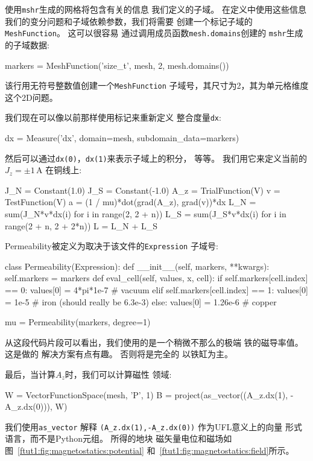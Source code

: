 使用\texttt{mshr}生成的网格将包含有关的信息
我们定义的子域。 在定义中使用这些信息
我们的变分问题和子域依赖参数，我们将需要
创建一个标记子域的\texttt{MeshFunction}。 这可以很容易
通过调用成员函数\texttt{mesh.domains}创建的
\texttt{mshr}生成的子域数据:

\begin{python}
markers = MeshFunction('size_t', mesh, 2, mesh.domains())
\end{python}
该行用无符号整数值创建一个\texttt{MeshFunction}
子域号，其尺寸为2，其为单元格维度
这个2D问题。

我们现在可以像以前那样使用标记来重新定义
整合度量\texttt{dx}:


\begin{python}
dx = Measure('dx', domain=mesh, subdomain_data=markers)
\end{python}
然后可以通过\texttt{dx(0)}，\texttt{dx(1)}来表示子域上的积分，
等等。 我们用它来定义当前的$J_z = \pm 1\,\mathrm{A}$
在铜线上:

\begin{python}
J_N = Constant(1.0)
J_S = Constant(-1.0)
A_z = TrialFunction(V)
v = TestFunction(V)
a = (1 / mu)*dot(grad(A_z), grad(v))*dx
L_N = sum(J_N*v*dx(i) for i in range(2, 2 + n))
L_S = sum(J_S*v*dx(i) for i in range(2 + n, 2 + 2*n))
L = L_N + L_S
\end{python}

Permeability被定义为取决于该文件的\texttt{Expression}
子域号:
\begin{python}
class Permeability(Expression):
    def __init__(self, markers, **kwargs):
        self.markers = markers
    def eval_cell(self, values, x, cell):
        if self.markers[cell.index] == 0:
            values[0] = 4*pi*1e-7 # vacuum
        elif self.markers[cell.index] == 1:
            values[0] = 1e-5      # iron (should really be 6.3e-3)
        else:
            values[0] = 1.26e-6   # copper

mu = Permeability(markers, degree=1)
\end{python}
从这段代码片段可以看出，我们使用的是一个稍微不那么的极端
铁的磁导率值。 这是做的
解决方案有点有趣。 否则将是完全的
以铁缸为主。

最后，当计算$A_z$时，我们可以计算磁性
领域:

\begin{python}
W = VectorFunctionSpace(mesh, 'P', 1)
B = project(as_vector((A_z.dx(1), -A_z.dx(0))), W)
\end{python}
我们使用\verb!as_vector! 解释
\verb!(A_z.dx(1),-A_z.dx(0))! 作为UFL意义上的向量
形式语言，而不是Python元组。 所得的地块
磁矢量电位和磁场如图~\ref{ftut1:fig:magnetostatics:potential}
和~\ref{ftut1:fig:magnetostatics:field}所示。

